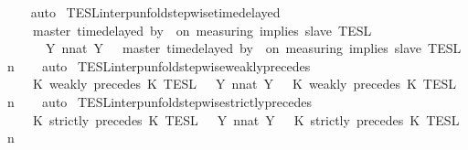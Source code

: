 \begin{isabellebody}
%
\isadelimproof
\ \ %
\endisadelimproof
%
\isatagproof
{}\isamarkupfalse%
\ auto%
\endisatagproof
{\isafoldproof}%
%
\isadelimproof
\isanewline
%
\endisadelimproof
\isanewline
{}\isamarkupfalse%
\ TESL{\isacharunderscore}interp{\isacharunderscore}unfold{\isacharunderscore}stepwise{\isacharunderscore}timedelayed{\isacharcolon}\isanewline
\ \ \ {\isacartoucheopen}{\isasymlbrakk}\ master\ time{\isacharminus}delayed\ by\ {\isasymdelta}{\isasymtau}\ on\ measuring\ implies\ slave\ {\isasymrbrakk}\isactrlsub T\isactrlsub E\isactrlsub S\isactrlsub L\isanewline
\ \ \ \ {\isacharequal}\ {\isasymInter}\ {\isacharbraceleft}Y{\isachardot}\ {\isasymexists}n{\isacharcolon}{\isacharcolon}nat{\isachardot}\ Y\ {\isacharequal}\ {\isasymlbrakk}\ master\ time{\isacharminus}delayed\ by\ {\isasymdelta}{\isasymtau}\ on\ measuring\ implies\ slave\ {\isasymrbrakk}\isactrlsub T\isactrlsub E\isactrlsub S\isactrlsub L\isactrlbsup {\isasymge}\ n\isactrlesup {\isacharbraceright}{\isacartoucheclose}\isanewline
%
\isadelimproof
\ \ %
\endisadelimproof
%
\isatagproof
{}\isamarkupfalse%
\ auto%
\endisatagproof
{\isafoldproof}%
%
\isadelimproof
\isanewline
%
\endisadelimproof
\isanewline
{}\isamarkupfalse%
\ TESL{\isacharunderscore}interp{\isacharunderscore}unfold{\isacharunderscore}stepwise{\isacharunderscore}weakly{\isacharunderscore}precedes{\isacharcolon}\isanewline
\ \ \ {\isacartoucheopen}{\isasymlbrakk}\ K\ weakly\ precedes\ K\ {\isasymrbrakk}\isactrlsub T\isactrlsub E\isactrlsub S\isactrlsub L\ {\isacharequal}\ {\isasymInter}\ {\isacharbraceleft}Y{\isachardot}\ {\isasymexists}n{\isacharcolon}{\isacharcolon}nat{\isachardot}\ Y\ {\isacharequal}\ {\isasymlbrakk}\ K\ weakly\ precedes\ K\ {\isasymrbrakk}\isactrlsub T\isactrlsub E\isactrlsub S\isactrlsub L\isactrlbsup {\isasymge}\ n\isactrlesup {\isacharbraceright}{\isacartoucheclose}\isanewline
%
\isadelimproof
\ \ %
\endisadelimproof
%
\isatagproof
{}\isamarkupfalse%
\ auto%
\endisatagproof
{\isafoldproof}%
%
\isadelimproof
\isanewline
%
\endisadelimproof
\isanewline
{}\isamarkupfalse%
\ TESL{\isacharunderscore}interp{\isacharunderscore}unfold{\isacharunderscore}stepwise{\isacharunderscore}strictly{\isacharunderscore}precedes{\isacharcolon}\isanewline
\ \ \ {\isacartoucheopen}{\isasymlbrakk}\ K\ strictly\ precedes\ K\ {\isasymrbrakk}\isactrlsub T\isactrlsub E\isactrlsub S\isactrlsub L\ {\isacharequal}\ {\isasymInter}\ {\isacharbraceleft}Y{\isachardot}\ {\isasymexists}n{\isacharcolon}{\isacharcolon}nat{\isachardot}\ Y\ {\isacharequal}\ {\isasymlbrakk}\ K\ strictly\ precedes\ K\ {\isasymrbrakk}\isactrlsub T\isactrlsub E\isactrlsub S\isactrlsub L\isactrlbsup {\isasymge}\ n\isactrlesup {\isacharbraceright}{\isacartoucheclose}\isanewline

\end{isabellebody}
